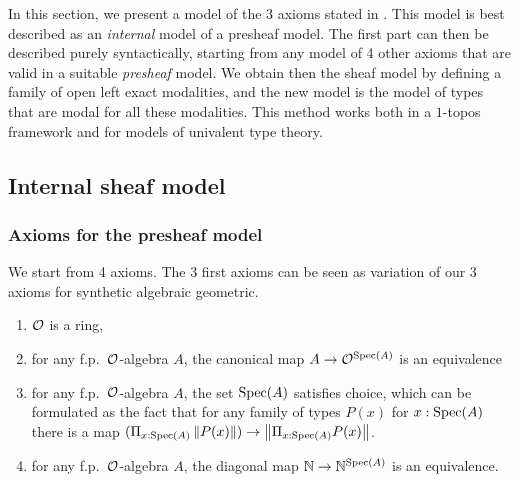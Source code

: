 \newcommand{\inc}{\mathsf{inc}}
\newcommand{\inl}{\mathsf{inl}}
\newcommand{\inr}{\mathsf{inr}}
\newcommand{\idd}{\mathsf{id}}
\newcommand{\II}{\mathbf{I}}
\newcommand{\nats}{\mathbb{N}}
\newcommand\norm[1]{\left\lVert #1 \right\rVert}


\newcommand{\ext}{\mathsf{ext}}
\newcommand{\patch}{\mathsf{patch}}
\newcommand{\cov}{\mathsf{cov}}
\newcommand{\isSheaf}{\mathsf{isSheaf}}
\newcommand{\isIso}{\mathsf{isIso}}
\newcommand{\Fib}{\mathsf{Fib}}

\newcommand{\Typp}{\mathsf{Type}}
\newcommand{\Elem}{\mathsf{Elem}}
\newcommand{\Cont}{\mathsf{Cont}}

\newcommand{\BB}{\square}
\newcommand{\CC}{\mathcal{C}}
\newcommand{\UU}{\mathcal{U}}
\newcommand{\WW}{\mathcal{W}}
\newcommand{\VV}{\mathcal{V}}

In this section, we present a model of the 3 axioms stated in .
This model is best described as an \emph{internal} model
of a presheaf model. The first part can then be described purely syntactically, starting from any model
of 4 other axioms that are valid in a suitable \emph{presheaf} model. We obtain then the sheaf model by defining
a family of open left exact modalities, and the new model is the model of types that are modal for all these modalities.
This method works both in a $1$-topos framework and for models of univalent type theory.

\subsection{Internal sheaf model}

\subsubsection{Axioms for the presheaf model}

We start from 4 axioms. The 3 first axioms can be seen as variation of our 3 axioms for synthetic algebraic geometric.

\begin{enumerate}[(1)]
\item $\mathcal O$ is a ring,
\item for any f.p.\ $\mathcal O$-algebra $A$, the canonical map $A\rightarrow \mathcal O^{\operatorname{Spec}(A)}$ is an equivalence
\item for any f.p.\ $\mathcal O$-algebra $A$, the set $\operatorname{Spec}(A)$ satisfies choice, which can be formulated as
  the fact that for any family of types $P(x)$ for $x:\operatorname{Spec}(A)$ there is a map
  $(\Pi_{x:\Spec(A)}\norm{P(x)})\rightarrow \norm{\Pi_{x:\Spec(A)}P(x)}$.
\item for any f.p.\ $\mathcal O$-algebra $A$, the diagonal map $\nats\rightarrow\nats^{\Spec(A)}$ is an equivalence.
\end{enumerate}

